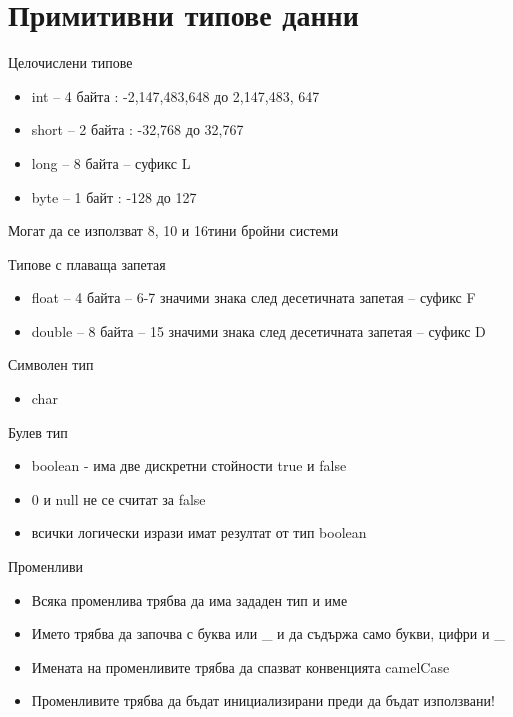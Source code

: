 \documentclass{beamer}
\begin{document}
\section{Примитивни типове данни}


\begin{frame}{Целочислени типове}
  \transdissolve
  \begin{itemize}
  \item int – 4 байта : -2,147,483,648 до
    2,147,483, 647
  \item short – 2 байта : -32,768 до 32,767
  \item long – 8 байта – суфикс L
  \item byte – 1 байт : -128 до 127
  \end{itemize}

  Могат да се използват 8, 10 и 16тини
  бройни системи
\end{frame}


\begin{frame}{Типове с плаваща запетая}
  \transdissolve
  \begin{itemize}
  \item   float – 4 байта – 6-7 значими знака след
    десетичната запетая – суфикс F
    \item double – 8 байта – 15 значими знака
    след десетичната запетая – суфикс D
  \end{itemize}
\end{frame}


\begin{frame}{Символен тип}
  \transdissolve
  \begin{itemize}
  \item char
  \end{itemize}
\end{frame}


\begin{frame}{Булев тип}
  \transdissolve
  \begin{itemize}
  \item boolean - има две дискретни стойности true и false
  \item 0 и null не се считат за false
  \item всички логически изрази имат резултат от тип boolean
  \end{itemize}
\end{frame}


\begin{frame}{Променливи}
  \transdissolve
  \begin{itemize}
  \item Всяка променлива трябва да има
    зададен тип и име

  \item Името трябва да започва с буква или \_
    и да съдържа само букви, цифри и \_

  \item Имената на променливите трябва да спазват конвенцията camelCase
  
  \item Променливите трябва да бъдат инициализирани преди да бъдат използвани!
  \end{itemize}
\end{frame}
\end{document}
